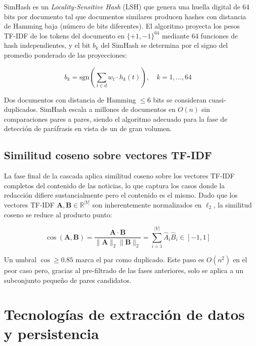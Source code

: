 SimHash \cite{charikar2002similarity} es un \textit{Locality-Sensitive Hash} (LSH)
que genera una huella digital de 64 bits por documento tal que documentos similares
producen hashes con distancia de Hamming baja (número de bits diferentes). El
algoritmo proyecta los pesos TF-IDF de los tokens del documento en $\{+1, -1\}^{64}$
mediante 64 funciones de hash independientes, y el bit $b_k$ del SimHash se determina
por el signo del promedio ponderado de las proyecciones:

\begin{equation}
    b_k = \text{sgn}\!\left(\sum_{t \in d} w_t \cdot h_k(t)\right), \quad k = 1, \ldots, 64
\end{equation}

Dos documentos con distancia de Hamming $\leq 6$ bits se consideran cuasi-duplicados.
SimHash escala a millones de documentos en $O(n)$ sin comparaciones pares a pares,
siendo el algoritmo adecuado para la fase de detección de paráfrasis en vista de un
de gran volumen.

\subsection{Similitud coseno sobre vectores TF-IDF}
\label{subsec:mt_coseno}

La fase final de la cascada aplica similitud coseno sobre los vectores TF-IDF
completos del contenido de las noticias, lo que captura los casos donde la redacción difiere
sustancialmente pero el contenido es el mismo. Dado que los vectores TF-IDF
$\mathbf{A}, \mathbf{B} \in \mathbb{R}^{|V|}$ son inherentemente normalizados
en $\ell_2$, la similitud coseno se reduce al producto punto:

\begin{equation}
    \cos(\mathbf{A}, \mathbf{B}) = \frac{\mathbf{A} \cdot \mathbf{B}}{\|\mathbf{A}\|_2 \|\mathbf{B}\|_2}
    = \sum_{i=1}^{|V|} \hat{A}_i \hat{B}_i \in [-1, 1]
\end{equation}

Un umbral $\cos \geq 0.85$ marca el par como duplicado. Este paso es $O(n^2)$ en
el peor caso pero, gracias al pre-filtrado de las fases anteriores, solo se aplica
a un subconjunto pequeño de pares candidatos.


\section{Tecnologías de extracción de datos y persistencia}
\label{sec:mt_extraccion}



